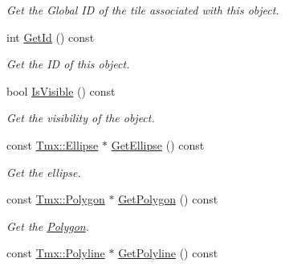 \begin{DoxyCompactItemize}
\begin{DoxyCompactList}\small\item\em Get the Global I\-D of the tile associated with this object. \end{DoxyCompactList}\item 
\hypertarget{classTmx_1_1Object_a4b4e2d5061460d1dad9f5adc55fd4968}{int \hyperlink{classTmx_1_1Object_a4b4e2d5061460d1dad9f5adc55fd4968}{Get\-Id} () const }\label{classTmx_1_1Object_a4b4e2d5061460d1dad9f5adc55fd4968}

\begin{DoxyCompactList}\small\item\em Get the I\-D of this object. \end{DoxyCompactList}\item 
\hypertarget{classTmx_1_1Object_ac96a42add7cbb9e07f54d88da78197b7}{bool \hyperlink{classTmx_1_1Object_ac96a42add7cbb9e07f54d88da78197b7}{Is\-Visible} () const }\label{classTmx_1_1Object_ac96a42add7cbb9e07f54d88da78197b7}

\begin{DoxyCompactList}\small\item\em Get the visibility of the object. \end{DoxyCompactList}\item 
\hypertarget{classTmx_1_1Object_a568bbdc1fb6bf9b8cdd7e9c5bb8f7f2c}{const \hyperlink{classTmx_1_1Ellipse}{Tmx\-::\-Ellipse} $\ast$ \hyperlink{classTmx_1_1Object_a568bbdc1fb6bf9b8cdd7e9c5bb8f7f2c}{Get\-Ellipse} () const }\label{classTmx_1_1Object_a568bbdc1fb6bf9b8cdd7e9c5bb8f7f2c}

\begin{DoxyCompactList}\small\item\em Get the ellipse. \end{DoxyCompactList}\item 
\hypertarget{classTmx_1_1Object_a92a590764cd276eb37d474b95c842ace}{const \hyperlink{classTmx_1_1Polygon}{Tmx\-::\-Polygon} $\ast$ \hyperlink{classTmx_1_1Object_a92a590764cd276eb37d474b95c842ace}{Get\-Polygon} () const }\label{classTmx_1_1Object_a92a590764cd276eb37d474b95c842ace}

\begin{DoxyCompactList}\small\item\em Get the \hyperlink{classTmx_1_1Polygon}{Polygon}. \end{DoxyCompactList}\item 
\hypertarget{classTmx_1_1Object_ad02f6a629bdc0ad5717839671dc31c98}{const \hyperlink{classTmx_1_1Polyline}{Tmx\-::\-Polyline} $\ast$ \hyperlink{classTmx_1_1Object_ad02f6a629bdc0ad5717839671dc31c98}{Get\-Polyline} () const }\label{classTmx_1_1Object_ad02f6a629bdc0ad5717839671dc31c98}


\end{DoxyCompactItemize}
